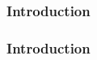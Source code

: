 \begin{frame}
    \frametitle{Introduction}
    \begin{minipage}{\textwidth}
    \end{minipage}
\end{frame}

\begin{frame}
    \frametitle{Introduction}
    \begin{minipage}{\textwidth}
    \end{minipage}
\end{frame}
